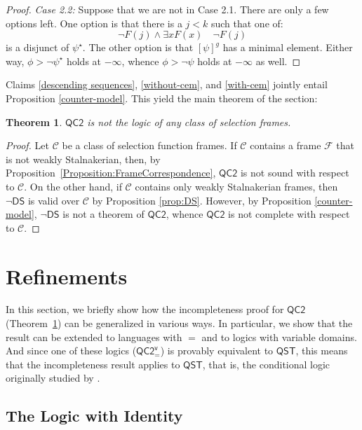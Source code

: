 \documentclass[12pt]{article}
\newtheorem{theorem}{Theorem}
\newcommand{\would}{\mathbin{>}}
\begin{document}
\begin{proof}
    \emph{Case 2.2:} Suppose that we are not in Case 2.1. 
    There are only a few options left. 
    One option is that there is a $j < k$ such that one of:
    $$\neg F(j) \wedge \exists x F(x) \quad \neg F(j)$$
    is a disjunct of $\psi^\star$. 
    The other option is that $[\psi]^g$ has a minimal element. 
    Either way, $\phi \would \neg\psi^\star$ holds at $-\infty$, whence $\phi \would \neg \psi$ holds at $-\infty$ as well.
\end{proof}


Claims \ref{descending sequences}, \ref{without-cem}, and \ref{with-cem} jointly entail Proposition \ref{counter-model}. This yield the main theorem of the section:


\begin{theorem}
\label{thm:QC2-incomp}
    $\mathsf{QC2}$ is not the logic of any class of selection frames.
\end{theorem}

\begin{proof}
    Let $\mathcal{C}$ be a class of selection function frames. 
    If $\mathcal{C}$ contains a frame $\mathcal{F}$ that is not weakly Stalnakerian, then, by Proposition~\ref{Proposition:FrameCorrespondence}, $\mathsf{QC2}$ is not sound with respect to $\mathcal{C}$. 
    On the other hand, if $\mathcal{C}$ contains only weakly Stalnakerian frames, then $\neg \mathsf{DS}$ is valid over $\mathcal{C}$ by Proposition \ref{prop:DS}. 
    However, by Proposition \ref{counter-model}, $\neg\mathsf{DS}$ is not a theorem of $\mathsf{QC2}$, whence $\mathsf{QC2}$ is not complete with respect to $\mathcal{C}$.
\end{proof}

\section{Refinements}
\label{Section:Refinements}

In this section, we briefly show how the incompleteness proof for $\mathsf{QC2}$ (Theorem~\ref{thm:QC2-incomp}) can be generalized in various ways. 
In particular, we show that the result can be extended to languages with $=$ and to logics with variable domains. 
And since one of these logics ($\mathsf{QC2^v_=}$) is provably equivalent to $\mathsf{QST}$, this means that the incompleteness result applies to $\mathsf{QST}$, that is, the conditional logic originally studied by \cite{StalnakerThomason1970}. 

\subsection{The Logic with Identity}
\label{Subsection:LogicwithIdentity}
\end{document}
